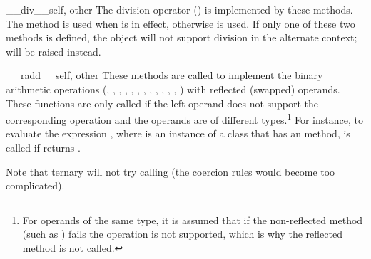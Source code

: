 \begin{methoddesc}{__div__}{self, other}
The division operator (\code{/}) is implemented by these methods.  The
 method is used when 
is in effect, otherwise  is used.  If only one of
these two methods is defined, the object will not support division in
the alternate context;  will be raised instead.
\end{methoddesc}

\begin{methoddesc}{__radd__}{self, other}
These methods are
called to implement the binary arithmetic operations (\code{+},
\code{-}, \code{*}, \code{/}, \code{\%},
,
, \code{**}, \code{<<},
\code{>>}, \code{\&}, \code{\^}, \code{|}) with reflected
(swapped) operands.  These functions are only called if the left
operand does not support the corresponding operation and the
operands are of different types.\footnote{
    For operands of the same type, it is assumed that if the
    non-reflected method (such as ) fails the
    operation is not supported, which is why the reflected method
    is not called.} 
For instance, to evaluate the expression \code{-},
where  is an instance of a class that has an
 method, 
is called if  returns
.

Note that ternary
 will not try calling
 (the coercion rules would become too
complicated).

\end{methoddesc}

